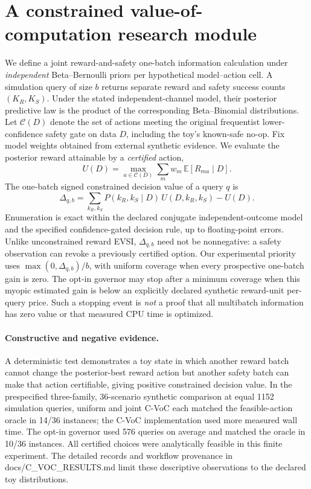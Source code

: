 \documentclass[11pt]{article}
\begin{document}
\section{A constrained value-of-computation research module}
We define a joint reward-and-safety one-batch information calculation under \emph{independent} Beta--Bernoulli priors per hypothetical model--action cell. A simulation query of size $b$ returns separate reward and safety success counts $(K_R,K_S)$. Under the stated independent-channel model, their posterior predictive law is the product of the corresponding Beta--Binomial distributions. Let $\mathcal C(D)$ denote the set of actions meeting the original frequentist lower-confidence safety gate on data $D$, including the toy's known-safe no-op. Fix model weights obtained from external synthetic evidence. We evaluate the posterior reward attainable by a \emph{certified} action,
\[
 U(D)=\max_{a\in\mathcal C(D)}\sum_m w_m\,\mathbb E[R_{ma}\mid D].
\]
The one-batch signed constrained decision value of a query $q$ is
\[
 \Delta_{q,b}=
 \sum_{k_R,k_S}P(k_R,k_S\mid D)\,
 U(D,k_R,k_S)-U(D).
\]
Enumeration is exact within the declared conjugate independent-outcome model and the specified confidence-gated decision rule, up to floating-point errors. Unlike unconstrained reward EVSI, $\Delta_{q,b}$ need not be nonnegative: a safety observation can revoke a previously certified option. Our experimental priority uses $\max(0,\Delta_{q,b})/b$, with uniform coverage when every prospective one-batch gain is zero. The opt-in governor may stop after a minimum coverage when this myopic estimated gain is below an explicitly declared synthetic reward-unit per-query price. Such a stopping event is \emph{not} a proof that all multibatch information has zero value or that measured CPU time is optimized.

\paragraph{Constructive and negative evidence.}
A deterministic test demonstrates a toy state in which another reward batch cannot change the posterior-best reward action but another safety batch can make that action certifiable, giving positive constrained decision value. In the prespecified three-family, 36-scenario synthetic comparison at equal 1152 simulation queries, uniform and joint C-VoC each matched the feasible-action oracle in 14/36 instances; the C-VoC implementation used more measured wall time. The opt-in governor used 576 queries on average and matched the oracle in 10/36 instances. All certified choices were analytically feasible in this finite experiment. The detailed records and workflow provenance in docs/C_VOC_RESULTS.md limit these descriptive observations to the declared toy distributions.
\end{document}
